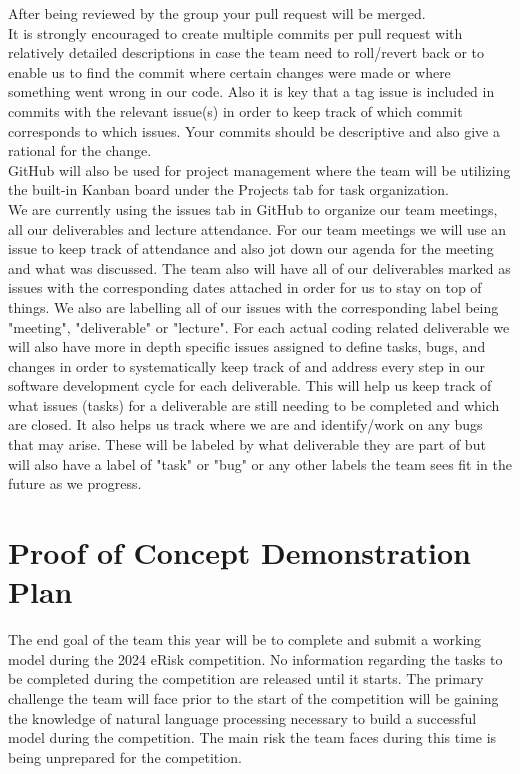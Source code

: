 \documentclass{article}
\begin{document}
After being reviewed by the group your pull request will be merged.\\

It is strongly encouraged to create multiple commits per pull request with relatively detailed descriptions in case the team need to roll/revert back or to enable us to find the commit where certain changes were made or where something went wrong in our code. Also it is key that a tag issue is included in commits with the relevant issue(s) in order to keep track of which commit corresponds to which issues. Your commits should be descriptive and also give a rational for the change.\\

GitHub will also be used for project management where the team will be utilizing the built-in Kanban board under the Projects tab for task organization. \\

We are currently using the issues tab in GitHub to organize our team meetings, all our deliverables and lecture attendance. For our team meetings we will use an issue to keep track of attendance and also jot down our agenda for the meeting and what was discussed. The team also will have all of our deliverables marked as issues with the corresponding dates attached in order for us to stay on top of things. We also are labelling all of our issues with the corresponding label being "meeting", "deliverable" or "lecture". For each actual coding related deliverable we will also have more in depth specific issues assigned to define tasks, bugs, and changes in order to systematically keep track of and address every step in our software development cycle for each deliverable. This will help us keep track of what issues (tasks) for a deliverable are still needing to be completed and which are closed. It also helps us track where we are and identify/work on any bugs that may arise. These will be labeled by what deliverable they are part of but will also have a label of "task" or "bug" or any other labels the team sees fit in the future as we progress.

\section{Proof of Concept Demonstration Plan}

The end goal of the team this year will be to complete and submit a working model during the 2024 eRisk competition. No information regarding the tasks to be completed during the competition are released until it starts. The primary challenge the team will face prior to the start of the competition will be gaining the knowledge of natural language processing necessary to build a successful model during the competition. The main risk the team faces during this time is being unprepared for the competition.
\end{document}
